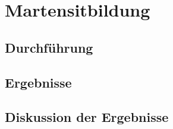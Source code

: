 \chapter{Martensitbildung}

\section{Durchführung}
\section{Ergebnisse}
\section{Diskussion der Ergebnisse}